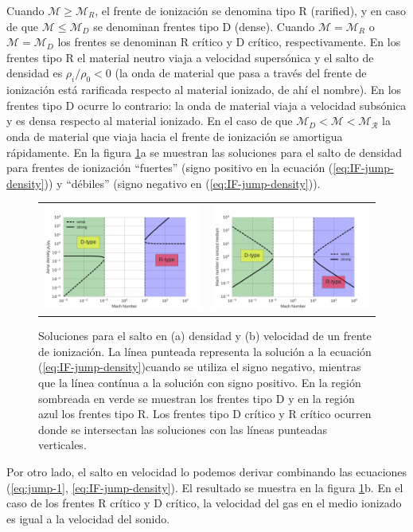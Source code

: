 Cuando $\mathcal{M} \geq \mathcal{M}_R$, el frente de ionización se denomina tipo R (rarified), y en caso de que $\mathcal{M} \leq \mathcal{M}_D$ se denominan frentes tipo D (dense). Cuando $\mathcal{M} = \mathcal{M}_R$ o $\mathcal{M} = \mathcal{M}_D$ los frentes se denominan R crítico y D crítico, respectivamente. En los frentes tipo R el material neutro viaja a velocidad supersónica y el salto de densidad es $\rho_i/\rho_0 < 0$ (la onda de material que pasa a través del frente de ionización está rarificada respecto al material ionizado, de ahí el nombre). En los frentes tipo D ocurre lo contrario: la onda de material viaja a velocidad subsónica y es densa respecto al material ionizado. En el caso de que $\mathcal{M}_D < \mathcal{M} < \mathcal{M_R}$ la onda de material que viaja hacia el frente de ionización se amortigua rápidamente. En la figura \ref{fig:IF-jump}a se muestran las soluciones para el salto de densidad para frentes de ionización ``fuertes'' (signo positivo en la ecuación (\ref{eq:IF-jump-density})) y ``débiles'' (signo negativo en (\ref{eq:IF-jump-density})).

\begin{figure}
  \begin{tabular}{lr}
    \includegraphics[width=0.5\linewidth]{./Figures/IF-types} &
    \includegraphics[width=0.5\linewidth]{./Figures/IF-vel-jump}
  \end{tabular}
  \caption{Soluciones para el salto en (a) densidad y (b) velocidad de un frente de ionización. La línea punteada representa la solución a la ecuación (\ref{eq:IF-jump-density})cuando se utiliza el signo negativo, mientras que la línea contínua a la solución con signo positivo. En la región sombreada en verde se muestran los frentes tipo D y en la región azul los frentes tipo R. Los frentes tipo D crítico y R crítico ocurren donde se intersectan las soluciones con las líneas punteadas verticales.}
  \label{fig:IF-jump}
\end{figure}
Por otro lado, el salto en velocidad lo podemos derivar combinando las ecuaciones (\ref{eq:jump-1}, \ref{eq:IF-jump-density}). El resultado se muestra en la figura \ref{fig:IF-jump}b. En el caso de los frentes R crítico y D crítico, la velocidad del gas en el medio ionizado es igual a la velocidad del sonido.

